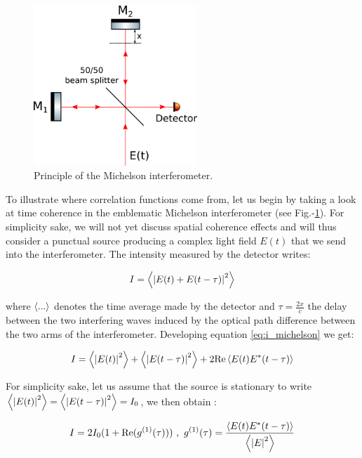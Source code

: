 \begin{figure}
    \centering
    \includegraphics[width=0.55\textwidth]{Fig/Chapter1/michelson.png}
    \caption{Principle of the Michelson interferometer.}
    \label{fig:michelson}
\end{figure}


To illustrate where correlation functions come from, let us begin by taking a look at time coherence in the emblematic Michelson interferometer (see Fig.-\ref{fig:michelson}). For simplicity sake, we will not yet discuss spatial coherence effects and will thus consider a punctual source producing a complex light field $E(t)$ that we send into the interferometer. The intensity measured by the detector writes:

\begin{equation}
    I=\left\langle\left\lvert E(t)+E(t-\tau)\right\rvert^2\right\rangle
    \label{eq:i_michelson}
\end{equation}

\noindent where $\left\langle...\right\rangle$ denotes the time average made by the detector and $\tau=\frac{2x}{c}$ the delay between the two interfering waves induced by the optical path difference between the two arms of the interferometer. Developing equation \ref{eq:i_michelson} we get:

\begin{equation}
    I=\left\langle\left\lvert E(t)\right\rvert^2\right\rangle + \left\langle\left\lvert E(t-\tau)\right\rvert^2\right\rangle + 2 {\rm{Re}} \left\langle E(t) E^*(t-\tau)\right\rangle
    \label{eq:def_g1}
\end{equation}

For simplicity sake, let us assume that the source is stationary to write $\left\langle\left\lvert E(t)\right\rvert^2\right\rangle = \left\langle\left\lvert E(t-\tau)\right\rvert^2\right\rangle = I_0$, we then obtain :

\begin{equation}
    I= 2 I_0 (1 + {\rm{Re}} (g^{(1)} (\tau))) \ , \ g^{(1)} (\tau) = \frac{ \left\langle E(t) E^*(t-\tau)\right\rangle}{\left\langle\left\lvert E\right\rvert^2\right\rangle}
\end{equation}

